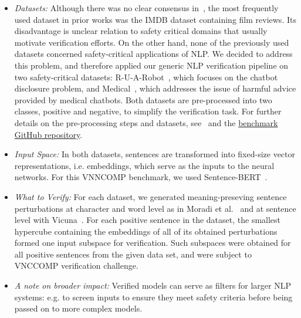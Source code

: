 \documentclass[oneside,11pt,dvipsnames]{book}
\begin{document}
\begin{itemize}
    \item \emph{Datasets:} Although there was no clear consensus in~\cite{jia2019certified,huang2019achieving,welbl2020towards,zhang2021certified,wang2023robustness,ko2019popqorn,du2021cert,shi2020robustness,bonaert2021fast}, the most frequently used dataset in prior works was the IMDB dataset containing film reviews. Its disadvantage is unclear relation to safety critical domains that usually motivate verification efforts. On the other hand, none of the previously used datasets concerned safety-critical applications of NLP. We decided to address this problem, and therefore applied our generic NLP verification pipeline on two safety-critical datasets:  R-U-A-Robot~\cite{gros2021ruarobot}, which focuses on the chatbot disclosure problem, and Medical~\cite{abercrombie2022risk}, which addresses the issue of harmful advice provided by medical chatbots. Both datasets are pre-processed into two classes, positive and negative, to simplify the verification task. For further details on the pre-processing steps and datasets, see~\cite{casadio2024nlp} and the \href{https://github.com/ANTONIONLP/safeNLP}{benchmark GitHub repository}.
    \item \emph{Input Space:} In both datasets, sentences are transformed into fixed-size vector representations, i.e. embeddings, which serve as the inputs to the neural networks. For this VNNCOMP benchmark, we used Sentence-BERT~\cite{reimers-gurevych-2019-sentence}. 
    \item \emph{What to Verify:} For each dataset, we generated meaning-preseving sentence perturbations at character and word level as in Moradi et al.~\cite{moradi2021evaluating} and at sentence level with Vicuna~\cite{vicuna2023}. For each positive sentence in the dataset, the smallest hypercube containing the embeddings of all of its obtained perturbations formed one input subspace for verification. Such subspaces were obtained for all positive sentences from the given data set, and were subject to VNCCOMP verification challenge. 
    \item \emph{A note on broader impact:} Verified models can serve as filters for larger NLP systems: e.g. to screen inputs to ensure they meet safety criteria before being passed on to more complex models.
\end{itemize}
\end{document}
